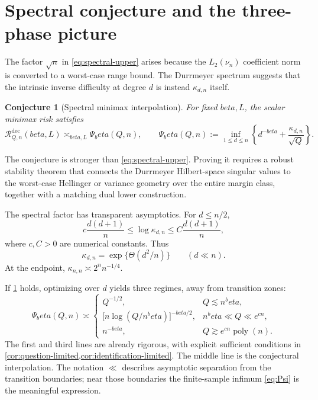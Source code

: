 \documentclass[11pt]{article}
\def\beta{beta}%
\newtheorem{conjecture}[theorem]{Conjecture}
\newcommand{\calR}{\mathcal R}
\begin{document}
\section{Spectral conjecture and the three-phase picture}
\label{sec:spectral-conjecture}

The factor $\sqrt n$ in \eqref{eq:spectral-upper} arises because the $L_2(\nu_n)$ coefficient norm is converted to a worst-case range bound.  The Durrmeyer spectrum suggests that the intrinsic inverse difficulty at degree $d$ is instead $\kappa_{d,n}$ itself.

\begin{conjecture}[Spectral minimax interpolation]
\label{conj:Psi}
For fixed $\beta,L$, the scalar minimax risk satisfies
\begin{equation}
\label{eq:Psi}
\calR^{\mathrm{dec}}_{Q,n}(\beta,L)
\asymp_{\beta,L}
\Psi_\beta(Q,n),
\qquad
\Psi_\beta(Q,n)
:=
\inf_{1\le d\le n}
\left\{
 d^{-\beta}
+
\frac{\kappa_{d,n}}{\sqrt Q}
\right\}.
\end{equation}
\end{conjecture}

The conjecture is stronger than \eqref{eq:spectral-upper}.  Proving it requires a robust stability theorem that connects the Durrmeyer Hilbert-space singular values to the worst-case Hellinger or variance geometry over the entire margin class, together with a matching dual lower construction.

The spectral factor has transparent asymptotics.  For $d\le n/2$,
\begin{equation}
\label{eq:kappa-asymp}
 c\frac{d(d+1)}{n}
\le
\log\kappa_{d,n}
\le
C\frac{d(d+1)}{n},
\end{equation}
where $c,C>0$ are numerical constants.  Thus
\[
\kappa_{d,n}
=
\exp\{\Theta(d^2/n)\}
\qquad(d\ll n).
\]
At the endpoint, $\kappa_{n,n}\asymp2^nn^{-1/4}$.

If \cref{conj:Psi} holds, optimizing over $d$ yields three regimes, away from transition zones:
\begin{equation}
\label{eq:three-phase}
\Psi_\beta(Q,n)
\asymp
\begin{cases}
Q^{-1/2},
&Q\lesssim n^\beta,\\[1.2ex]
\bigl[n\log(Q/n^\beta)\bigr]^{-\beta/2},
&n^\beta\ll Q\ll e^{cn},\\[1.2ex]
n^{-\beta},
&Q\gtrsim e^{cn}\operatorname{poly}(n).
\end{cases}
\end{equation}
The first and third lines are already rigorous, with explicit sufficient conditions in \cref{cor:question-limited,cor:identification-limited}.  The middle line is the conjectural interpolation.  The notation $\ll$ describes asymptotic separation from the transition boundaries; near those boundaries the finite-sample infimum \eqref{eq:Psi} is the meaningful expression.
\end{document}
